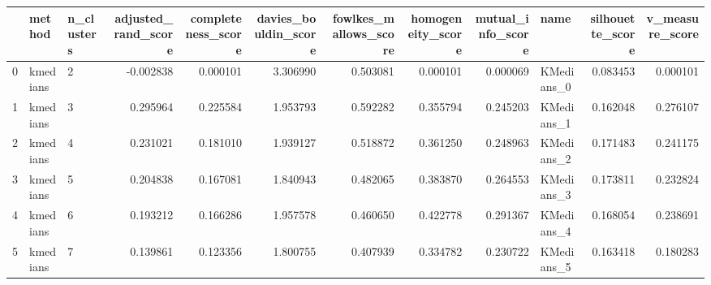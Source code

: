 \begin{tabular}{lllrrrrrrlrr}
\toprule
{} &    method & n\_clusters &  adjusted\_rand\_score &  completeness\_score &  davies\_bouldin\_score &  fowlkes\_mallows\_score &  homogeneity\_score &  mutual\_info\_score &        name &  silhouette\_score &  v\_measure\_score \\
\midrule
0 &  kmedians &          2 &            -0.002838 &            0.000101 &              3.306990 &               0.503081 &           0.000101 &           0.000069 &  KMedians\_0 &          0.083453 &         0.000101 \\
1 &  kmedians &          3 &             0.295964 &            0.225584 &              1.953793 &               0.592282 &           0.355794 &           0.245203 &  KMedians\_1 &          0.162048 &         0.276107 \\
2 &  kmedians &          4 &             0.231021 &            0.181010 &              1.939127 &               0.518872 &           0.361250 &           0.248963 &  KMedians\_2 &          0.171483 &         0.241175 \\
3 &  kmedians &          5 &             0.204838 &            0.167081 &              1.840943 &               0.482065 &           0.383870 &           0.264553 &  KMedians\_3 &          0.173811 &         0.232824 \\
4 &  kmedians &          6 &             0.193212 &            0.166286 &              1.957578 &               0.460650 &           0.422778 &           0.291367 &  KMedians\_4 &          0.168054 &         0.238691 \\
5 &  kmedians &          7 &             0.139861 &            0.123356 &              1.800755 &               0.407939 &           0.334782 &           0.230722 &  KMedians\_5 &          0.163418 &         0.180283 \\
\bottomrule
\end{tabular}
